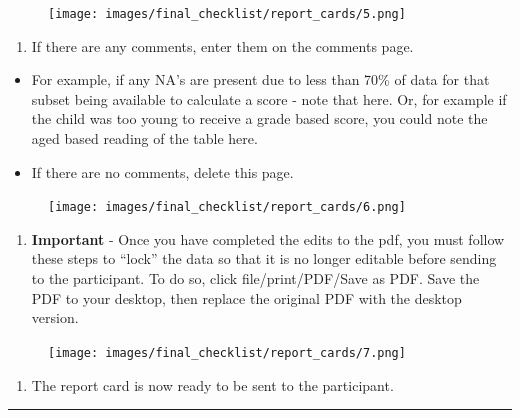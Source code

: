 \documentclass[
]{book}
\providecommand{\tightlist}{%
  \setlength{\itemsep}{0pt}\setlength{\parskip}{0pt}}
\begin{document}
\begin{figure}
\centering
\texttt{[image: images/final\_checklist/report\_cards/5.png]}
\caption{}
\end{figure}

\begin{enumerate}
\def\labelenumi{\arabic{enumi}.}
\setcounter{enumi}{5}
\tightlist
\item
  If there are any comments, enter them on the comments page.
\end{enumerate}

\begin{itemize}
\item
  For example, if any NA's are present due to less than 70\% of data for that subset being available to calculate a score - note that here. Or, for example if the child was too young to receive a grade based score, you could note the aged based reading of the table here.
\item
  If there are no comments, delete this page.
\end{itemize}

\begin{figure}
\centering
\texttt{[image: images/final\_checklist/report\_cards/6.png]}
\caption{}
\end{figure}

\begin{enumerate}
\def\labelenumi{\arabic{enumi}.}
\setcounter{enumi}{6}
\tightlist
\item
  \textbf{Important} - Once you have completed the edits to the pdf, you must follow these steps to ``lock'' the data so that it is no longer editable before sending to the participant. To do so, click file/print/PDF/Save as PDF. Save the PDF to your desktop, then replace the original PDF with the desktop version.
\end{enumerate}

\begin{figure}
\centering
\texttt{[image: images/final\_checklist/report\_cards/7.png]}
\caption{}
\end{figure}

\begin{enumerate}
\def\labelenumi{\arabic{enumi}.}
\setcounter{enumi}{7}
\tightlist
\item
  The report card is now ready to be sent to the participant.
\end{enumerate}

\begin{center}\rule{0.5\linewidth}{0.5pt}\end{center}
\end{document}
